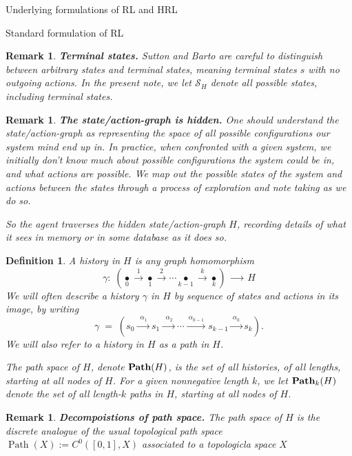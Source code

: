 \documentclass[11pt]{article}
\newtheorem{definition}[subsubsection]{Definition}
\newtheorem{remark}[subsubsection]{Remark}
\newcommand{\Path}{\operatorname{Path}}
\begin{document}
\begin{section}{Underlying formulations of RL and HRL}
\begin{subsection}{Standard formulation of RL}
\begin{remark}
{\bf Terminal states.}
\normalfont
Sutton and Barto are careful to distinguish between arbitrary states and {\em terminal} states, meaning terminal states $s$ with no outgoing actions. In the present note, we let $\mathcal{S}_{H}$ denote {\em all} possible states, including terminal states.
\end{remark}

\begin{remark}
{\bf The state/action-graph is {\em hidden}.}
\normalfont
One should understand the state/action-graph as representing the space of all possible configurations our system mind end up in. In practice, when confronted with a given system, we initially don't know much about possible configurations the system could be in, and what actions are possible. We map out the possible states of the system and actions between the states through a process of exploration and note taking as we do so.

So the agent traverses the hidden state/action-graph $H$, recording details of what it sees in memory or in some database as it does so.
\end{remark}

\begin{definition}
\normalfont
A {\em history} in $H$ is any graph homomorphism
$$
\gamma:\;\left(\underset{0}{\bullet}\xrightarrow{\ \ 1\ \ }\underset{1}{\bullet}\xrightarrow{\ \ 2\ \ }\cdots\underset{k-1}{\bullet}\xrightarrow{\ \ k\ \ }\underset{k}{\bullet}\right)
\;\xrightarrow{\ \ \ \ \ \ \ }\;H
$$
We will often describe a history $\gamma$ in $H$ by sequence of states and actions in its image, by writing
\begin{equation}\label{eq: general history}
\gamma\;=\;\left(s_{0}\xrightarrow{\ \ \alpha_{1}\ }s_{1}\xrightarrow{\ \ \alpha_{2}\ }\cdots\xrightarrow{\ \alpha_{k-1}\ }s_{k-1}\xrightarrow{\ \alpha_{k}\ }s_{k}\right).
\end{equation}
We will also refer to a history in $H$ as a {\em path} in $H$.

	The {\em path space} of $H$, denote $\bold{Path}(H)$, is the set of all histories, of all lengths, starting at all nodes of $H$. For a given nonnegative length $k$, we let $\bold{Path}_{k}(H)$ denote the set of all length-$k$ paths in $H$, starting at all nodes of $H$.
\end{definition}

\begin{remark}
{\bf Decompoistions of path space.}
\normalfont
The path space of $H$ is the discrete analogue of the usual topological path space $\Path(X):=C^0([0,1],X)$ associated to a topologicla space $X$


\end{remark}
\end{subsection}
\end{section}
\end{document}

